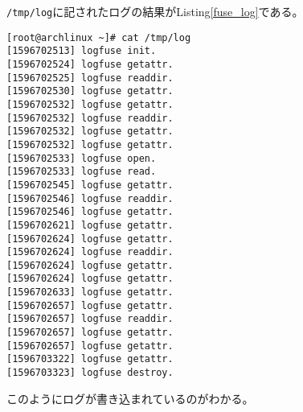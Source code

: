 \documentclass[main]{subfiles}
\begin{document}
\texttt{/tmp/log}に記されたログの結果がListing\ref{fuse_log}である。

\begin{lstlisting}[label=fuse_log,caption=ログ]
[root@archlinux ~]# cat /tmp/log 
[1596702513] logfuse init.
[1596702524] logfuse getattr.
[1596702525] logfuse readdir.
[1596702530] logfuse getattr.
[1596702532] logfuse getattr.
[1596702532] logfuse readdir.
[1596702532] logfuse getattr.
[1596702532] logfuse getattr.
[1596702533] logfuse open.
[1596702533] logfuse read.
[1596702545] logfuse getattr.
[1596702546] logfuse readdir.
[1596702546] logfuse getattr.
[1596702621] logfuse getattr.
[1596702624] logfuse getattr.
[1596702624] logfuse readdir.
[1596702624] logfuse getattr.
[1596702624] logfuse getattr.
[1596702633] logfuse getattr.
[1596702657] logfuse getattr.
[1596702657] logfuse readdir.
[1596702657] logfuse getattr.
[1596702657] logfuse getattr.
[1596703322] logfuse getattr.
[1596703323] logfuse destroy.
\end{lstlisting}

このようにログが書き込まれているのがわかる。
\end{document}
